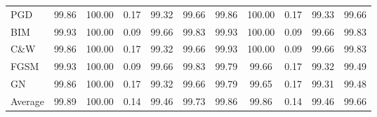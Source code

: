 \begin{table*}[t]
{\begin{tabular}{p{1.2cm}|ccccc|ccccc}
       
        PGD&99.86&100.00&0.17&99.32&99.66&99.86&100.00&0.17&99.33&99.66\\
        BIM&99.93&100.00&0.09&99.66&99.83&99.93&100.00&0.09&99.66&99.83\\
        C\&W &99.86&100.00&0.17&99.32&99.66&99.93&100.00&0.09&99.66&99.83\\
        FGSM&99.93&100.00&0.09&99.66&99.83&99.79&99.66&0.17&99.32&99.49\\
        GN &99.86&100.00&0.17&99.32&99.66&99.79&99.65&0.17&99.31&99.48\\ \midrule
        Average &99.89&100.00&0.14&99.46&99.73&99.86&99.86&0.14&99.46&99.66\\ \bottomrule
    \end{tabular}
    }
    \vspace{-5mm}
\end{table*}

